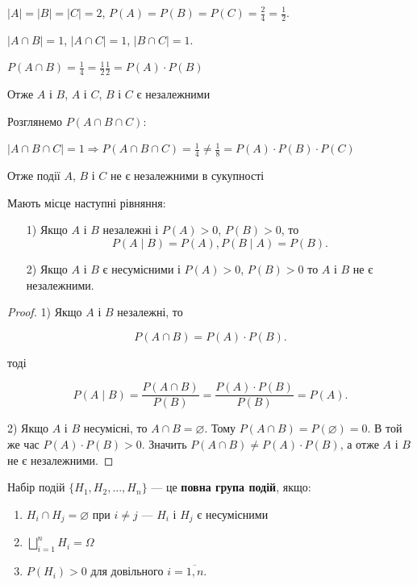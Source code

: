 $|A| = |B| = |C| = 2$, 
$P(A) = P(B) = P(C) = \frac{2}{4} = \frac{1}{2}$.

$|A \cap B| = 1$, $|A \cap C| = 1$, $|B \cap C| = 1$.

$P(A \cap B) = \frac{1}{4} = \frac{1}{2} \frac{1}{2} = P(A) \cdot P(B)$

Отже $A$ і $B$, $A$ і $C$, $B$ і $C$ є незалежними

Розглянемо $P(A \cap B \cap C)$:

$|A \cap B \cap C|
= 1 \Rightarrow P(A \cap B \cap C)
= \frac{1}{4}
\neq \frac{1}{8}
= P(A) \cdot P(B) \cdot P(C)$

Отже події $A$, $B$ і $C$ не є незалежними в сукупності

\begin{claim}
    Мають місце наступні рівняння:
    \begin{itemize}
        \item[1)] Якщо $A$ і $B$ незалежні і $P(A) > 0$, $P(B) > 0$, то
            $$P(A \mid B) = P(A), P(B \mid A) = P(B).$$        
        \item[2)] Якщо $A$ і $B$ є несумісними і $P(A) > 0$, $P(B) > 0$ то $A$ і $B$ не є незалежними.
    \end{itemize}
\end{claim}
\begin{proof}
    1) Якщо $A$ і $B$ незалежні, то
    
    $$P(A \cap B) = P(A) \cdot P(B).$$
    
    тоді
    
    $$P(A \mid B)
    = \frac{P(A \cap B)}{P(B)}
    = \frac{P(A) \cdot P(B)}{P(B)}
    = P(A).$$
    
    2) Якщо $A$ і $B$ несумісні, то $A \cap B = \varnothing$. Тому
    $P(A \cap B) = P(\varnothing) = 0$. В той же час $P(A) \cdot P(B) > 0$.
    Значить $P(A \cap B) \neq P(A) \cdot P(B)$, а отже $A$ і $B$ не є незалежними.
\end{proof}

\begin{definition}
    Набір подій $\{H_1, H_2, ..., H_n\}$ --- це \textbf{повна група подій}, якщо:
    \begin{enumerate}
        \item $H_i \cap H_j = \varnothing$ при $i \neq j$ --- $H_i$ і $H_j$ є несумісними
        \item $\bigsqcup\limits_{i=1}^n H_i = \Omega$
        \item $P(H_i) > 0$ для довільного $i = \overline{1, n}$.
    \end{enumerate}
\end{definition}

